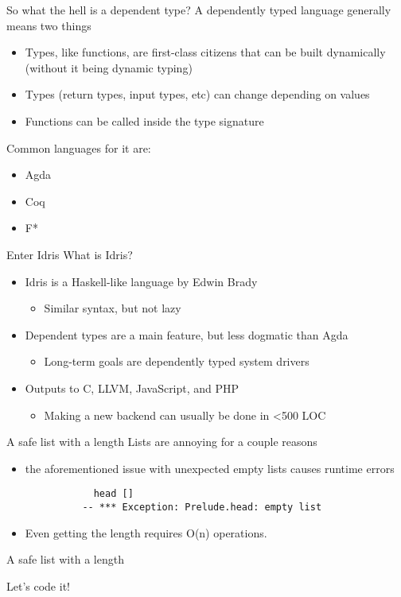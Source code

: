 \documentclass{beamer}
\begin{document}
\begin{frame}{So what the hell is a dependent type? }
	A dependently typed language generally means two things
	\begin{itemize}	
		\item Types, like functions, are first-class citizens that can be built dynamically (without it being dynamic typing)
		\item Types (return types, input types, etc) can change depending on values
                \item Functions can be called inside the type signature
	\end{itemize}
	Common languages for it are: 

	\begin{itemize}	
		\item Agda
		\item Coq 
		\item F*
	\end{itemize}
\end{frame}
\begin{frame}{Enter Idris}
	What is Idris? 
	\begin{itemize}
		\item Idris is a Haskell-like language by Edwin Brady \begin{itemize}
				\item Similar syntax, but not lazy
	\end{itemize}
\item Dependent types are a main feature, but less dogmatic than Agda \begin{itemize}
		\item Long-term goals are dependently typed system drivers
	\end{itemize}
		\item Outputs to C, LLVM, JavaScript, and PHP \begin{itemize}
				\item Making a new backend can usually be done in \textless 500 LOC
			\end{itemize}
	\end{itemize}
\end{frame}
\begin{frame}[fragile]{A safe list with a length}
	Lists are annoying for a couple reasons
	\begin{itemize}
		\item the aforementioned issue with unexpected empty lists causes runtime errors
		\begin{lstlisting} 
			head [] 
		  -- *** Exception: Prelude.head: empty list
		\end{lstlisting}
	\item Even getting the length requires O(n) operations.
	\end{itemize}
	
\end{frame}
\begin{frame}[fragile]{A safe list with a length}
	\begin{center} 
		Let's code it!
	\end{center}
\end{frame}
\end{document}
